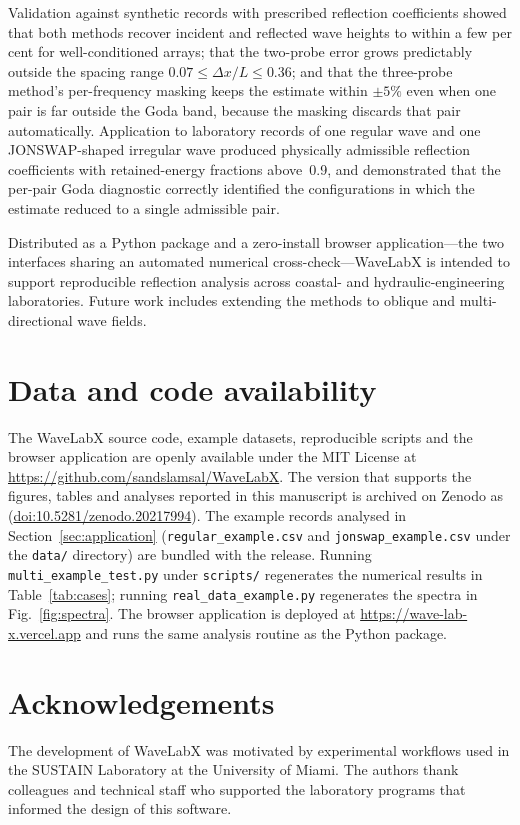 \documentclass[preprint,12pt,a4paper]{elsarticle}
\begin{document}
Validation against synthetic records with prescribed reflection
coefficients showed that both methods recover incident and reflected
wave heights to within a few per cent for well-conditioned arrays;
that the two-probe error grows predictably outside the spacing range
$0.07 \le \Delta x/L \le 0.36$; and that the three-probe method's
per-frequency masking keeps the estimate within $\pm 5\%$ even when
one pair is far outside the Goda band, because the masking discards
that pair automatically. Application to laboratory records of one
regular wave and one JONSWAP-shaped irregular wave produced
physically admissible reflection coefficients with retained-energy
fractions above~0.9, and demonstrated that the per-pair Goda
diagnostic correctly identified the configurations in which the
estimate reduced to a single admissible pair.

Distributed as a Python package and a zero-install browser
application---the two interfaces sharing an automated numerical
cross-check---WaveLabX is intended to support reproducible reflection
analysis across coastal- and hydraulic-engineering laboratories.
Future work includes extending the methods to oblique and
multi-directional wave fields.

\section*{Data and code availability}
\begin{sloppypar}
The WaveLabX source code, example datasets, reproducible scripts and
the browser application are openly available under the MIT License at
\url{https://github.com/sandslamsal/WaveLabX}. The version that
supports the figures, tables and analyses reported in this manuscript
is archived on Zenodo as \citet{lamsal2025wavelabx}
(\href{https://doi.org/10.5281/zenodo.20217994}{doi:10.5281/zenodo.20217994}).
The example records analysed in Section~\ref{sec:application}
(\texttt{regular\_example.csv} and \texttt{jonswap\_example.csv} under
the \texttt{data/} directory) are bundled with the release. Running
\texttt{multi\_example\_test.py} under \texttt{scripts/} regenerates
the numerical results in Table~\ref{tab:cases}; running
\texttt{real\_data\_example.py} regenerates the spectra in
Fig.~\ref{fig:spectra}. The browser application is deployed at
\url{https://wave-lab-x.vercel.app} and runs the same analysis routine
as the Python package.
\end{sloppypar}

\section*{Acknowledgements}
The development of WaveLabX was motivated by experimental workflows
used in the SUSTAIN Laboratory at the University of Miami. The authors
thank colleagues and technical staff who supported the laboratory
programs that informed the design of this software.

\FloatBarrier


\end{document}
